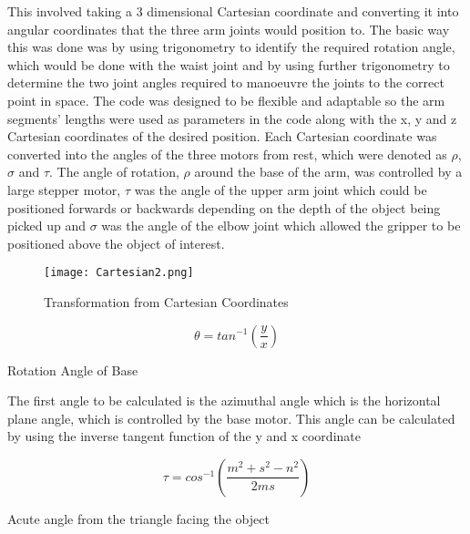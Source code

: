 This involved taking a 3 dimensional Cartesian coordinate and converting it into angular coordinates that the three arm joints would position to.  The basic way this was done was by using trigonometry to identify the required rotation angle, which would be done with the waist joint and by using further trigonometry to determine the two joint angles required to manoeuvre the joints to the correct point in space.	
\newline
The code was designed to be flexible and adaptable so the arm segments’ lengths were used as parameters in the code along with the x, y and z Cartesian coordinates of the desired position.  
\newline
Each Cartesian coordinate was converted into the angles of the three motors from rest, which were denoted as $\rho$, $\sigma$ and $\tau$.  The angle of rotation, $\rho$ around the base of the arm, was controlled by a large stepper motor, $\tau$ was the angle of the upper arm joint which could be positioned forwards or backwards depending on the depth of the object being picked up and $\sigma$ was the angle of the elbow joint which allowed the gripper to be positioned above the object of interest.  

\begin{figure}[!htb]
\begin{center}
\texttt{[image: Cartesian2.png]}
\end{center}
\caption{Transformation from Cartesian Coordinates}
\label{fig:cartesian}
\end{figure}

\begin{capequ}[!htb]
\begin{center}
\begin{equation}
\theta = tan^{-1}\left (  \frac{y}{x}\right )
\end{equation}
\caption{Rotation Angle of Base}
\label{Equation4}
\end{center}
\end{capequ}

The first angle to be calculated is the azimuthal angle which is the horizontal plane angle, which is controlled by the base motor.
This angle can be calculated by using the inverse tangent function of the y and x coordinate

\begin{capequ}[!htb]
\begin{center}
\begin{equation}
\tau = cos^{-1}\left (\frac{m^{2}+s^{2}-n^{2}}{2ms}\right )
\end{equation}
\caption{Acute angle from the triangle facing the object}
\label{Equation6}
\end{center}
\end{capequ}

